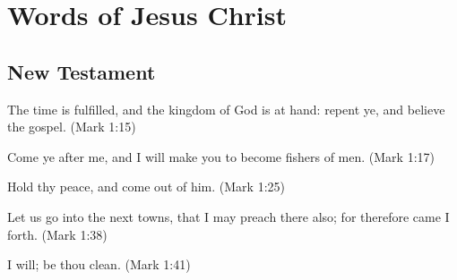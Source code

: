 \chapter{Words of Jesus Christ}

\section{New Testament}

The time is fulfilled, and the kingdom of God is at hand: repent ye, and believe the gospel. (Mark 1:15)

Come ye after me, and I will make you to become fishers of men. (Mark 1:17)

Hold thy peace, and come out of him. (Mark 1:25)

Let us go into the next towns, that I may preach there also; for therefore came I forth. (Mark 1:38)

I will; be thou clean. (Mark 1:41)
